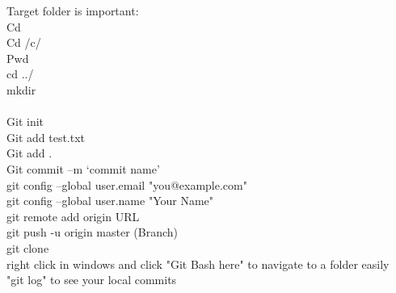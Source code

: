 \documentclass[12pt]{article}
\begin{document}
Target folder is important:\\
Cd\\
Cd /c/\\
Pwd\\
cd ../\\
mkdir\\
\\
Git init\\
Git add test.txt\\
Git add .\\
Git commit –m ‘commit name’\\
git config --global user.email "you@example.com"\\
git config --global user.name "Your Name"\\
git remote add origin URL\\
git push -u origin master (Branch)\\
git clone\\
right click in windows and click "Git Bash here" to navigate to a folder easily\\
"git log" to see your local commits\\
\end{document}
